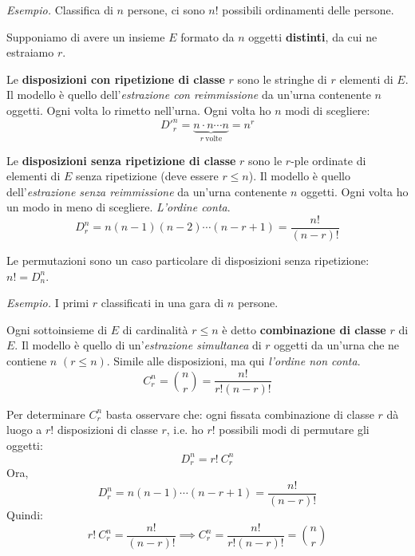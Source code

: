\textit{Esempio.} Classifica di $n$ persone, ci sono $n!$ possibili ordinamenti delle persone.

Supponiamo di avere un insieme $E$ formato da $n$ oggetti \textbf{distinti}, da cui ne estraiamo $r$.
\begin{defn}
	Le \textbf{disposizioni con ripetizione di classe }$r$ sono le stringhe di $r$ elementi di $E$. Il modello è quello dell'\textit{estrazione con reimmissione} da un'urna contenente $n$ oggetti. Ogni volta lo rimetto nell'urna. Ogni volta ho $n$ modi di scegliere:
	\begin{equation*}
		\boxed{D'^{n}_{r} =\underbrace{n\cdot n\cdots n}_{r\ \text{volte}} =n^{r}}
	\end{equation*}
\end{defn}

\begin{defn}
	Le \textbf{disposizioni senza ripetizione di classe} $r$ sono le $r$-ple ordinate di elementi di $E$ senza ripetizione (deve essere $r\leq n$). Il modello è quello dell'\textit{estrazione senza reimmissione} da un'urna contenente $n$ oggetti. Ogni volta ho un modo in meno di scegliere. \textit{L'ordine conta}.
	\begin{equation*}
		\boxed{D_{r}^{n} =n(n-1)(n-2) \cdots (n-r+1) =\frac{n!}{(n-r) !}}
	\end{equation*}
\end{defn}

\begin{rem}
	Le permutazioni sono un caso particolare di disposizioni senza ripetizione: $n!=D_{n}^{n}$.
\end{rem}

\textit{Esempio.} I primi $r$ classificati in una gara di $n$ persone.

\begin{defn}
	Ogni sottoinsieme di $E$ di cardinalità $r\leq n$ è detto \textbf{combinazione di classe} $r$ di $E$. Il modello è quello di un'\textit{estrazione simultanea} di $r$ oggetti da un'urna che ne contiene $n$ $(r\leq n)$. Simile alle disposizioni, ma qui \textit{l'ordine non conta}.
	\begin{equation*}
		\boxed{C_{r}^{n} =\binom{n}{r} =\frac{n!}{r!(n-r) !}}
	\end{equation*}
\end{defn}

\begin{rem}
Per determinare $C_{r}^{n}$ basta osservare che: ogni fissata combinazione di classe $r$ dà luogo a $r!$ disposizioni di classe $r$, i.e. ho $r!$ possibili modi di permutare gli oggetti:
	\begin{equation*}
		D_{r}^{n} =r!\ C_{r}^{n}
	\end{equation*}
	Ora,
	\begin{equation*}
		D_{r}^{n} =n(n-1) \cdots (n-r+1) =\frac{n!}{(n-r) !}
	\end{equation*}
	Quindi:
	\begin{equation*}
		r!\ C_{r}^{n} =\frac{n!}{(n-r) !} \implies C_{r}^{n} =\frac{n!}{r!(n-r) !} =\binom{n}{r}
	\end{equation*}
\end{rem}

